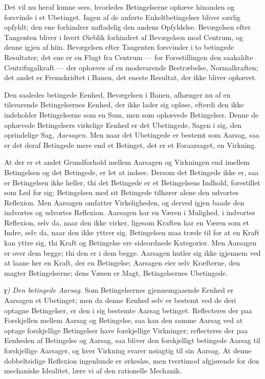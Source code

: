 \documentclass[12pt,a4paper]{book}
\newcommand{\subrunin}[1]{\emph{#1}\hspace{0.4em}}
\begin{document}
Det vil nu heraf kunne sees, hvorledes Betingelserne ophæve hinanden og
forsvinde i et Ubetinget. Ingen af de anførte Enkeltbetingelser bliver
særlig opfyldt; den ene forhindrer uafladelig den andens Opfyldelse.
Bevægelsen efter Tangenten bliver i hvert Øieblik forhindret af
Bevægelsen mod Centrum, og denne igjen af hiin. Bevægelsen efter
Tangenten forsvinder i to betingede Resultater; det ene er en Flugt fra
Centrum --- for Forestillingen den saakaldte Centrifugalkraft --- der
ophæves af en modsvarende Bestræbelse, Normalkraften; det andet er
Fremskridtet i Banen, det eneste Resultat, der ikke bliver ophævet.

Den saaledes betingede Eenhed, Bevægelsen i Banen, afhænger nu af en
tilsvarende Betingelsernes Eenhed, der ikke lader sig opløse, efterdi den
ikke indeholder Betingelserne som en Sum, men som ophævede Betingelser.
Denne de ophævede Betingelsers virkelige Eenhed er det Ubetingede, Sagen
i sig, den oprindelige Sag, \emph{Aarsagen}. Men naar det Ubetingede er
bestemt som Aarsag, saa er det deraf
Betingede mere end et Betinget, det er et Foraarsaget, en Virkning.

At der er et andet Grundforhold mellem Aarsagen og Virkningen end imellem
Betingelsen og det Betingede, er let at indsee. Dersom det Betingede ikke
er, saa er Betingelsen ikke heller, thi det Betingede er et Betingelsens
Indhold, forestillet som Led for sig; Betingelsen med sit Betingede
tilhører alene den udvortes Reflexion. Men Aarsagen omfatter
Virkeligheden, og derved igjen baade den indvortes og udvortes Reflexion.
Aarsagen har en Væren i Mulighed, i indvortes Reflexion, selv da, naar
den ikke virker, ligesom Kraften har en Væren som et Indre, selv da, naar
den ikke yttrer sig. Betingelsen maa træde til for at en Kraft kan yttre
sig, thi Kraft og Betingelse ere sideordnede Kategorier. Men Aarsagen er
over dem begge; thi den er i dem begge. Aarsagen hutler sig ikke
igjennem ved at laane her en Kraft, der en Betingelse; Aarsagen eier selv
Kræfterne, den magter Betingelserne; dens Væsen er Magt, Betingelsernes
Ubetingede.

\subrunin{γ) Den betingede Aarsag.} Som Betingelsernes gjennemgaaende
Eenhed er Aarsagen et Ubetinget; men da denne Eenhed selv er bestemt ved
de deri optagne Betingelser, er den i sig bestemte Aarsag betinget.
Reflecteres der paa Forskjellen mellem Aarsag og Betingelse, saa kan den
samme Aarsag ved at optage forskjellige Betingelser have forskjellige
Virkninger; reflecteres der paa Eenheden af Betingelse og Aarsag, saa
bliver den forskjelligt betingede Aarsag til forskjellige Aarsager, og
hver Virkning svarer nøiagtig til sin Aarsag. At denne dobbeltsidige
Reflexion ingenlunde er ørkesløs, men tvertimod afgjørende for den
mechaniske Idealitet, lære vi af den rationelle Mechanik.
\end{document}
